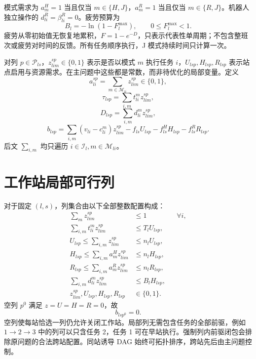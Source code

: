 \documentclass[UTF8,a4paper,11pt]{ctexart}
\newcommand{\cg}[1]{\tag{CG-#1}}
\begin{document}
模式需求为 $a_m^H=1$ 当且仅当 $m\in\{H,J\}$，$a_m^R=1$ 当且仅当 $m\in\{R,J\}$。机器人独立操作的 $d_{li}^R=\beta_{li}^R=0$。疲劳预算为
\begin{equation}
B_l=-\ln(1-F_l^{\max}),\qquad 0\leq F_l^{\max}<1.\cg{2}
\end{equation}
疲劳从零初始值无恢复地累积，$F=1-e^{-D}$，只表示代表性单周期；不包含整班次或疲劳对时间的反馈。所有任务顺序执行，J 模式持续时间只计算一次。

对列 $p\in\mathcal P_{ls}$，$z_{lim}^{sp}\in\{0,1\}$ 表示是否以模式 $m$ 执行任务 $i$，$U_{lsp},H_{lsp},R_{lsp}$ 表示站点启用与资源需求。在主问题中这些都是常数，而非待优化的局部变量。定义
\begin{equation}a_{li}^{sp}=\sum_{m\in\mathcal M_{li}}z_{lim}^{sp}\in\{0,1\},\cg{3}\end{equation}
\begin{equation}\tau_{lsp}=\sum_{i,m}t_{li}^mz_{lim}^{sp},\cg{4}\end{equation}
\begin{equation}D_{lsp}=\sum_{i,m}d_{li}^mz_{lim}^{sp},\cg{5}\end{equation}
\begin{equation}
b_{lsp}=\sum_{i,m}(v_{li}-c_{li}^m)z_{lim}^{sp}
-f_{ls}U_{lsp}-f_{ls}^HH_{lsp}-f_{ls}^RR_{lsp}.\cg{6}
\end{equation}
后文 $\sum_{i,m}$ 均只遍历 $i\in\mathcal I_l,m\in\mathcal M_{li}$。

\section{工作站局部可行列}
对于固定 $(l,s)$，列集合由以下全部整数配置构成：
\begin{align}
\sum_m z_{lim}^{sp}&\leq1 &&\forall i,\cg{7}\\
\sum_{i,m}t_{li}^mz_{lim}^{sp}&\leq T_lU_{lsp},\cg{8}\\
U_{lsp}\leq\sum_{i,m}z_{lim}^{sp}&\leq n_lU_{lsp},\cg{9}\\
H_{lsp}\leq\sum_{i,m}a_m^Hz_{lim}^{sp}&\leq n_lH_{lsp},\cg{10}\\
R_{lsp}\leq\sum_{i,m}a_m^Rz_{lim}^{sp}&\leq n_lR_{lsp},\cg{11}\\
\sum_{i,m}d_{li}^mz_{lim}^{sp}&\leq B_lH_{lsp},\cg{12}\\
z_{lim}^{sp},U_{lsp},H_{lsp},R_{lsp}&\in\{0,1\}.\cg{13}
\end{align}
空列 $p^0$ 满足 $z=U=H=R=0$，故
\begin{equation}b_{lsp^0}=0.\cg{14}\end{equation}
空列使每站恰选一列仍允许关闭工作站。局部列无需包含任务的全部前驱，例如 $1\to2\to3$ 中的列可以只含任务 2，任务 1 可在早站执行。强制列内前驱闭包会排除原问题的合法跨站配置。同站诱导 DAG 始终可拓扑排序，跨站先后由主问题控制。
\end{document}
